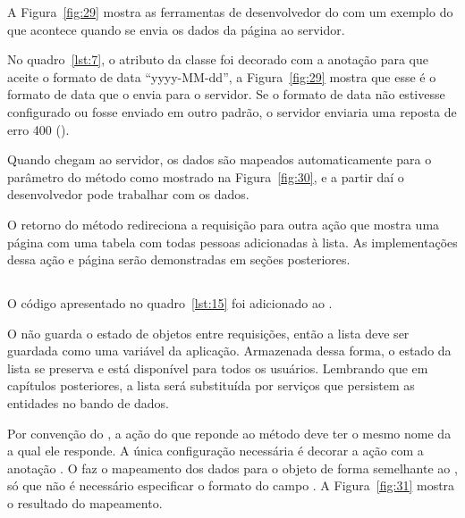 A Figura~\ref{fig:29} mostra as ferramentas de desenvolvedor do  com um exemplo do que acontece quando se envia os dados da página ao servidor.


No quadro~\ref{lst:7}, o atributo  da classe  foi decorado com a anotação  para que aceite o formato de data “yyyy-MM-dd”, a Figura~\ref{fig:29} mostra que esse é o formato de data que o  envia para o servidor. Se o formato de data não estivesse configurado ou fosse enviado em outro padrão, o servidor enviaria uma reposta de erro 400 ().

Quando chegam ao servidor, os dados são mapeados automaticamente para o parâmetro  do método  como mostrado na Figura~\ref{fig:30}, e a partir daí o desenvolvedor pode trabalhar com os dados.


O retorno do método  redireciona a requisição para outra ação que mostra uma página com uma tabela com todas pessoas adicionadas à lista. As implementações dessa ação e página serão demonstradas em seções posteriores.

\subsection{}

O código apresentado no quadro~\ref{lst:15} foi adicionado ao .


O  não guarda o estado de objetos entre requisições, então a lista deve ser guardada como uma variável da aplicação. Armazenada dessa forma, o estado da lista se preserva e está disponível para todos os usuários. Lembrando que em capítulos posteriores, a lista será substituída por serviços que persistem as entidades no bando de dados.

Por convenção do , a ação do  que reponde ao método  deve ter o mesmo nome da  a qual ele responde.  A única configuração necessária é decorar a ação com a anotação . O  faz o mapeamento dos dados para o objeto  de forma semelhante ao , só que não é necessário especificar o formato do campo . A Figura~\ref{fig:31} mostra o resultado do mapeamento.

